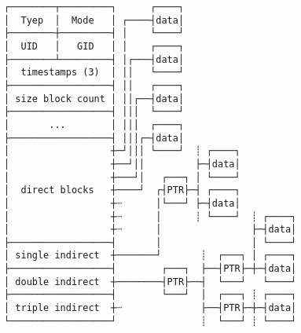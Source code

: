 \documentclass[varwidth,crop]{standalone}
\begin{document}
\begin{verbatim}
┌────────┬─────────┐      ┌────┐
│  Tyep  │  Mode   │ ┌────┤data│
├────────┼─────────┤ │    └────┘
│  UID   │   GID   │ │    ┌────┐
├────────┴─────────┤ │┌───┤data│
│  timestamps (3)  │ ││   └────┘
├──────────────────┤ ││   ┌────┐
│ size block count │ ││┌──┤data│
├──────────────────┤ │││  └────┘
│       ...        │ │││  ┌────┐
├──────────────────┤ │││┌─┤data│
│                  ┼─┘│││ └────┘  ┊ ┌────┐
│                  ┼──┘││         ├─┤data│
│                  ┼───┘│   ┌───┐ │ └────┘
│  direct blocks   ┼────┘  ┌┤PTR├─┤ ┌────┐
│                  ┼┈      │└───┘ ├─┤data│
│                  ┼┈      │      ┊ └────┘  ┊ ┌────┐
│                  ┼┈      │                ├─┤data│
├──────────────────┤       │                │ └────┘
│ single indirect  ┼───────┘       ┊  ┌───┐ │ ┌────┐
├──────────────────┤        ┌───┐  ├──┤PTR├─┼─┤data│
│ double indirect  ┼────────┤PTR├──┤  └───┘   └────┘
├──────────────────┤        └───┘  │  ┌───┐ ┊ ┌────┐
│ triple indirect  ┼┈              ├──┤PTR├─┼─┤data│
└──────────────────┘               ┊  └───┘ ┊ └────┘
\end{verbatim}
\end{document}
